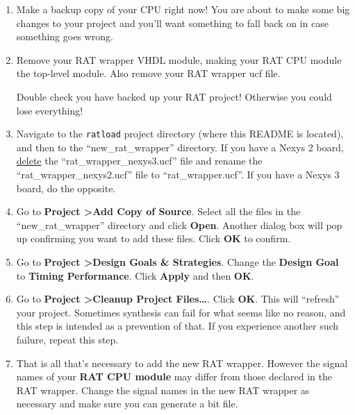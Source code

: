\documentclass[notitlepage]{article}
\newcommand{\warningsign}{\fontencoding{U}\fontfamily{futs}\Large\selectfont\char 66\relax}
\begin{document}
\begin {enumerate}

\item Make a backup copy of your CPU right now! You are about to make some big changes to your project and you'll want something to fall back on in case something goes wrong.

\item Remove your RAT wrapper VHDL module, making your RAT CPU module the top-level module. Also remove your RAT wrapper ucf file.

\begin{infobox}
  {\warningsign} Double check you have backed up your RAT project! Otherwise you could lose everything!
\end{infobox}

\item Navigate to the \texttt{ratload} project directory (where this README is located), and then to the ``new\_rat\_wrapper'' directory. If you have a Nexys 2 board, \underline{delete} the ``rat\_wrapper\_nexys3.ucf'' file and rename the ``rat\_wrapper\_nexys2.ucf'' file to ``rat\_wrapper.ucf''. If you have a Nexys 3 board, do the opposite.

\item Go to \textbf{Project \textgreater Add Copy of Source}. Select all the files in the ``new\_rat\_wrapper'' directory and click \textbf{Open}. Another dialog box will pop up confirming you want to add these files. Click \textbf{OK} to confirm.

\item Go to \textbf{Project \textgreater Design Goals \& Strategies}. Change the \textbf{Design Goal} to \textbf{Timing Performance}. Click \textbf{Apply} and then \textbf{OK}.

\item Go to \textbf{Project \textgreater Cleanup Project Files\ldots}. Click \textbf{OK}. This will ``refresh'' your project. Sometimes synthesis can fail for what seems like no reason, and this step is intended as a prevention of that. If you experience another such failure, repeat this step.

\item That is all that's necessary to add the new RAT wrapper. However the signal names of your \textbf{RAT CPU module} may differ from those declared in the RAT wrapper. Change the signal names in the new RAT wrapper as necessary and make sure you can generate a bit file.
\end{enumerate}
\end{document}
